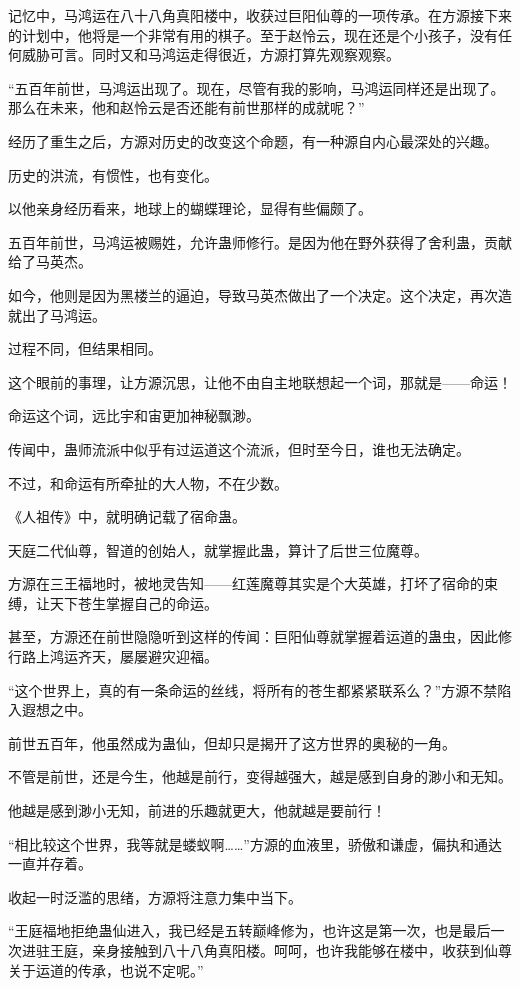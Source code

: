 \begin{this_body}
记忆中，马鸿运在八十八角真阳楼中，收获过巨阳仙尊的一项传承。在方源接下来的计划中，他将是一个非常有用的棋子。至于赵怜云，现在还是个小孩子，没有任何威胁可言。同时又和马鸿运走得很近，方源打算先观察观察。

“五百年前世，马鸿运出现了。现在，尽管有我的影响，马鸿运同样还是出现了。那么在未来，他和赵怜云是否还能有前世那样的成就呢？”

经历了重生之后，方源对历史的改变这个命题，有一种源自内心最深处的兴趣。

历史的洪流，有惯性，也有变化。

以他亲身经历看来，地球上的蝴蝶理论，显得有些偏颇了。

五百年前世，马鸿运被赐姓，允许蛊师修行。是因为他在野外获得了舍利蛊，贡献给了马英杰。

如今，他则是因为黑楼兰的逼迫，导致马英杰做出了一个决定。这个决定，再次造就出了马鸿运。

过程不同，但结果相同。

这个眼前的事理，让方源沉思，让他不由自主地联想起一个词，那就是——命运！

命运这个词，远比宇和宙更加神秘飘渺。

传闻中，蛊师流派中似乎有过运道这个流派，但时至今日，谁也无法确定。

不过，和命运有所牵扯的大人物，不在少数。

《人祖传》中，就明确记载了宿命蛊。

天庭二代仙尊，智道的创始人，就掌握此蛊，算计了后世三位魔尊。

方源在三王福地时，被地灵告知——红莲魔尊其实是个大英雄，打坏了宿命的束缚，让天下苍生掌握自己的命运。

甚至，方源还在前世隐隐听到这样的传闻：巨阳仙尊就掌握着运道的蛊虫，因此修行路上鸿运齐天，屡屡避灾迎福。

“这个世界上，真的有一条命运的丝线，将所有的苍生都紧紧联系么？”方源不禁陷入遐想之中。

前世五百年，他虽然成为蛊仙，但却只是揭开了这方世界的奥秘的一角。

不管是前世，还是今生，他越是前行，变得越强大，越是感到自身的渺小和无知。

他越是感到渺小无知，前进的乐趣就更大，他就越是要前行！

“相比较这个世界，我等就是蝼蚁啊……”方源的血液里，骄傲和谦虚，偏执和通达一直并存着。

收起一时泛滥的思绪，方源将注意力集中当下。

“王庭福地拒绝蛊仙进入，我已经是五转巅峰修为，也许这是第一次，也是最后一次进驻王庭，亲身接触到八十八角真阳楼。呵呵，也许我能够在楼中，收获到仙尊关于运道的传承，也说不定呢。”


\end{this_body}
